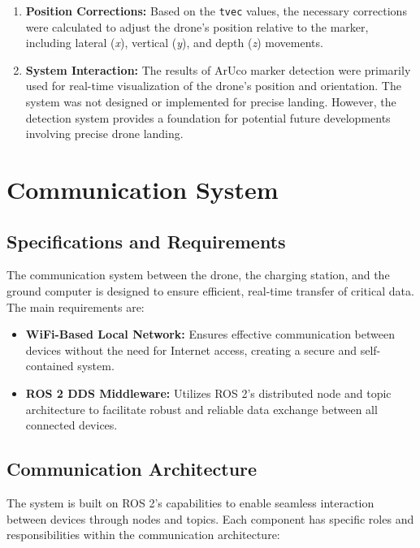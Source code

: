 \begin{enumerate}
        \item \textbf{Position Corrections:} 
        Based on the \texttt{tvec} values, the necessary corrections were calculated to adjust the drone's position relative to the marker, including lateral (\textit{x}), vertical (\textit{y}), and depth (\textit{z}) movements.
    
        \item \textbf{System Interaction:} 
        The results of ArUco marker detection were primarily used for real-time visualization of the drone's position and orientation. The system was not designed or implemented for precise landing. However, the detection system provides a foundation for potential future developments involving precise drone landing.
    \end{enumerate}
            
        
\section{Communication System}

    \subsection{Specifications and Requirements} 
    The communication system between the drone, the charging station, and the ground computer is designed to ensure efficient, real-time transfer of critical data. The main requirements are:
    
    \begin{itemize} 
        \item \textbf{WiFi-Based Local Network:} Ensures effective communication between devices without the need for Internet access, creating a secure and self-contained system. 
        \item \textbf{ROS 2 DDS Middleware:} Utilizes ROS 2's distributed node and topic architecture to facilitate robust and reliable data exchange between all connected devices. 
    \end{itemize}
    
    \subsection{Communication Architecture} 
    The system is built on ROS 2's capabilities to enable seamless interaction between devices through nodes and topics. Each component has specific roles and responsibilities within the communication architecture:
    
